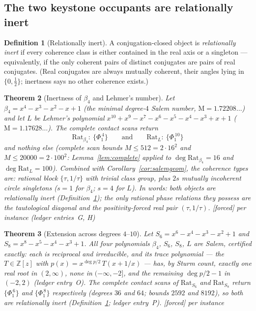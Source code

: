 \documentclass[11pt]{article}
\theoremstyle{plain}
\newtheorem{theorem}{Theorem}[section]
\theoremstyle{definition}
\newtheorem{definition}[theorem]{Definition}
\theoremstyle{remark}
\newcommand{\Z}{\mathbb{Z}}
\newcommand{\Mah}{\mathrm{M}}
\newcommand{\Rat}{\mathrm{Rat}}
\newcommand{\F}{\textnormal{[forced]}}
\begin{document}
\subsection{The two keystone occupants are relationally inert}

\begin{definition}[Relationally inert]\label{def:inert}
A conjugation-closed object is \emph{relationally inert} if every coherence
class is either contained in the real axis or a singleton --- equivalently,
if the only coherent pairs of distinct conjugates are pairs of real
conjugates. (Real conjugates are always mutually coherent, their angles
lying in $\{0,\tfrac12\}$; inertness says no other coherence exists.)
\end{definition}

\begin{theorem}[Inertness of $\beta_4$ and Lehmer's number]\label{thm:inert}
Let $\beta_4=x^4-x^3-x^2-x+1$ (the minimal degree-$4$ Salem number,
$\Mah=1.72208\ldots$) and let $L$ be Lehmer's polynomial
$x^{10}+x^9-x^7-x^6-x^5-x^4-x^3+x+1$ ($\Mah=1.17628\ldots$). The complete
contact scans return
\[
\Rat_{\beta_4}:\ \{\Phi_1^{\,4}\}\qquad\text{and}\qquad
\Rat_{L}:\ \{\Phi_1^{\,10}\}
\]
and nothing else (complete scan bounds $M\le512=2\cdot16^2$ and
$M\le20000=2\cdot100^2$: Lemma~\ref{lem:complete} applied to
$\deg\Rat_{\beta_4}=16$ and $\deg\Rat_L=100$). Combined
with Corollary~\ref{cor:salemgeom}, the coherence types are: rational block
$\{\tau,1/\tau\}$ with trivial class group, plus $2s$ mutually incoherent
circle singletons ($s=1$ for $\beta_4$; $s=4$ for $L$). In words: \emph{both
objects are relationally inert (Definition~\ref{def:inert}); the only rational
phase relations they possess are the tautological diagonal and the
positivity-forced real pair $(\tau,1/\tau)$.}
\F{} per instance (ledger entries~G, H)
\end{theorem}

\begin{theorem}[Extension across degrees $4$--$10$]\label{thm:inertmore}
Let $S_6=x^6-x^4-x^3-x^2+1$ and $S_8=x^8-x^5-x^4-x^3+1$. All four polynomials
$\beta_4$, $S_6$, $S_8$, $L$ are Salem, certified exactly: each is reciprocal
and irreducible, and its trace polynomial --- the $T\in\Z[z]$ with
$p(x)=x^{\deg p/2}\,T(x+1/x)$ --- has, by Sturm count, exactly one real root
in $(2,\infty)$, none in $(-\infty,-2]$, and the remaining $\deg p/2-1$ in
$(-2,2)$ (ledger entry~O). The complete contact scans of $\Rat_{S_6}$ and
$\Rat_{S_8}$ return $\{\Phi_1^{\,6}\}$ and $\{\Phi_1^{\,8}\}$ respectively
(degrees $36$ and $64$; bounds $2592$ and $8192$), so both are relationally
inert (Definition~\ref{def:inert}; ledger entry~P). \F{} per instance
\end{theorem}
\end{document}
